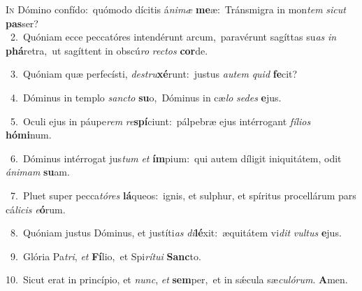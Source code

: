 \lettrine{\initial\textcolor{\initialcolor}{I}}{n} Dómino confído:~\dagger quómodo dícitis á\-\textit{ni}\-\textit{mæ} \textbf{me}\-æ:~\star Tránsmigra in mon\textit{tem} \textit{sic}\-\textit{ut} \textbf{pas}\-ser?\\
{\numbfont\textcolor{\numbcolor}{~2.}}~Quóniam ecce peccatóres intendérunt arcum,~\dagger paravérunt sagíttas su\textit{as} \textit{in} \textbf{phá}\-retra,~\star ut sagíttent in obscú\textit{ro} \textit{rec}\-\textit{tos} \textbf{cor}\-de.\par
{\numbfont\textcolor{\numbcolor}{~3.}}~Quóniam quæ perfecísti, \textit{de}\-\textit{stru}\textbf{xé}runt:~\star justus \textit{au}\-\textit{tem} \textit{quid} \textbf{fe}\-cit?\par
{\numbfont\textcolor{\numbcolor}{~4.}}~Dóminus in templo \textit{sanc}\-\textit{to} \textbf{su}\-o,~\star Dóminus in cæ\textit{lo} \textit{se}\-\textit{des} \textbf{e}\-jus.\par
{\numbfont\textcolor{\numbcolor}{~5.}}~Oculi ejus in páupe\textit{rem} \textit{re}\-\textbf{spí}ciunt:~\star pálpebræ ejus intérrogant \textit{fí}\-\textit{li}\textit{os} \textbf{hó}\-\textbf{mi}num.\par
{\numbfont\textcolor{\numbcolor}{~6.}}~Dóminus intérrogat jus\textit{tum} \textit{et} \textbf{ím}\-pium:~\star qui autem díligit iniquitátem, odit \textit{á}\-\textit{ni}\textit{mam} \textbf{su}\-am.\par
{\numbfont\textcolor{\numbcolor}{~7.}}~Pluet super pecca\-\textit{tó}\-\textit{res} \textbf{lá}\-queos:~\star ignis, et sulphur, et spíritus procellárum pars cá\-\textit{li}\-\textit{cis} \textit{e}\-\textbf{ó}rum.\par
{\numbfont\textcolor{\numbcolor}{~8.}}~Quóniam justus Dóminus, et justíti\textit{as} \textit{di}\-\textbf{lé}xit:~\star æquitátem vi\textit{dit} \textit{vul}\-\textit{tus} \textbf{e}\-jus.\par
{\numbfont\textcolor{\numbcolor}{~9.}}~Glória Pa\-\textit{tri}\-, \textit{et} \textbf{Fí}\-lio,~\star et Spi\-\textit{rí}\-\textit{tu}\textit{i} \textbf{Sanc}\-to.\par
{\numbfont\textcolor{\numbcolor}{10.}}~Sicut erat in princípio, et \textit{nunc}\-, \textit{et} \textbf{sem}\-per,~\star et in sǽcula sæ\-\textit{cu}\-\textit{ló}\textit{rum}. \textbf{A}\-men.\par
